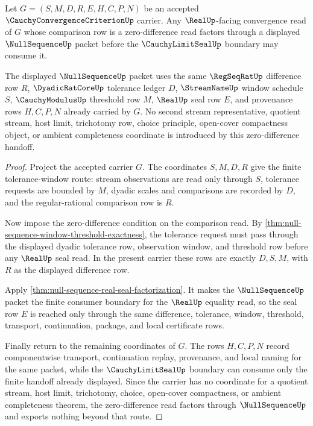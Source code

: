 \begin{theorem}
\label{thm:cauchy-convergence-criterion-nullsequence-factorization}
Let $G=(S,M,D,R,E,H,C,P,N)$ be an accepted $\CauchyConvergenceCriterionUp$ carrier. Any $\RealUp$-facing convergence read of $G$ whose comparison row is a zero-difference read factors through a displayed $\NullSequenceUp$ packet before the $\CauchyLimitSealUp$ boundary may consume it.

The displayed $\NullSequenceUp$ packet uses the same $\RegSeqRatUp$ difference row $R$, $\DyadicRatCoreUp$ tolerance ledger $D$, $\StreamNameUp$ window schedule $S$, $\CauchyModulusUp$ threshold row $M$, $\RealUp$ seal row $E$, and provenance rows $H,C,P,N$ already carried by $G$. No second stream representative, quotient stream, host limit, trichotomy row, choice principle, open-cover compactness object, or ambient completeness coordinate is introduced by this zero-difference handoff.
\end{theorem}
\begin{proof}
Project the accepted carrier $G$. The coordinates $S,M,D,R$ give the finite tolerance-window route: stream observations are read only through $S$, tolerance requests are bounded by $M$, dyadic scales and comparisons are recorded by $D$, and the regular-rational comparison row is $R$.

Now impose the zero-difference condition on the comparison read. By \autoref{thm:null-sequence-window-threshold-exactness}, the tolerance request must pass through the displayed dyadic tolerance row, observation window, and threshold row before any $\RealUp$ seal read. In the present carrier these rows are exactly $D,S,M$, with $R$ as the displayed difference row.

Apply \autoref{thm:null-sequence-real-seal-factorization}. It makes the $\NullSequenceUp$ packet the finite consumer boundary for the $\RealUp$ equality read, so the seal row $E$ is reached only through the same difference, tolerance, window, threshold, transport, continuation, package, and local certificate rows.

Finally return to the remaining coordinates of $G$. The rows $H,C,P,N$ record componentwise transport, continuation replay, provenance, and local naming for the same packet, while the $\CauchyLimitSealUp$ boundary can consume only the finite handoff already displayed. Since the carrier has no coordinate for a quotient stream, host limit, trichotomy, choice, open-cover compactness, or ambient completeness theorem, the zero-difference read factors through $\NullSequenceUp$ and exports nothing beyond that route.
\end{proof}

